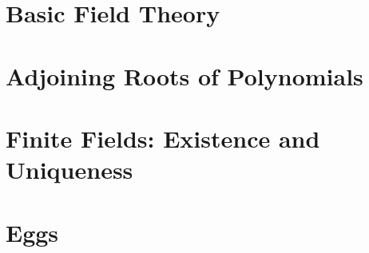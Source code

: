 \documentclass{../ccg-notes}
\author{Colton Grainger}
\date{\today}
\begin{document}
\frontstuff

\section{Basic Field Theory}
	
\section{Adjoining Roots of Polynomials}
	
\section{Finite Fields: Existence and Uniqueness}

\section{Eggs}
	
\end{document}
